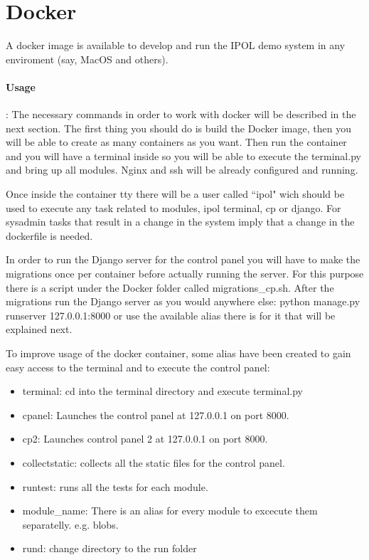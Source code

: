 \documentclass[a4paper,12pt]{article}
\begin{document}
\section{Docker}
A docker image is available to develop and run the IPOL demo system in any enviroment (say, MacOS and others).

\paragraph{Usage}:
The necessary commands in order to work with docker will be described in the next section. The first thing you should do is
build the Docker image, then you will be able to create as many containers as you want. Then run the container and you
will have a terminal inside so you will be able to execute the terminal.py and bring up all modules. Nginx and ssh will be already
configured and running.

Once inside the container tty there will be a user called ``ipol" wich should be used to execute any task related to modules, ipol terminal, 
cp or django. For sysadmin tasks that result in a change in the system imply that a change in the dockerfile is needed.
 
In order to run the Django server for the control panel you will have to make the migrations once per
container before actually running the server. For this purpose there is a script under the Docker folder called migrations\_cp.sh.
 After the migrations run the Django server as you would anywhere else: python manage.py runserver 127.0.0.1:8000 or use the available 
 alias there is for it that will be explained next.
 
 To improve usage of the docker container, some alias have been created to gain easy access to the terminal and to execute the control panel:
 \begin{itemize}
 	\item terminal: cd into the terminal directory and execute terminal.py
 	\item cpanel: Launches the control panel at 127.0.0.1 on port 8000.
 	\item cp2: Launches control panel 2 at 127.0.0.1 on port 8000.
 	\item collectstatic: collects all the static files for the control panel.
 	\item runtest: runs all the tests for each module.
 	\item module\_name: There is an alias for every module to excecute them separatelly. e.g. blobs.
 	\item rund: change directory to the run folder
 \end{itemize}
\end{document}
